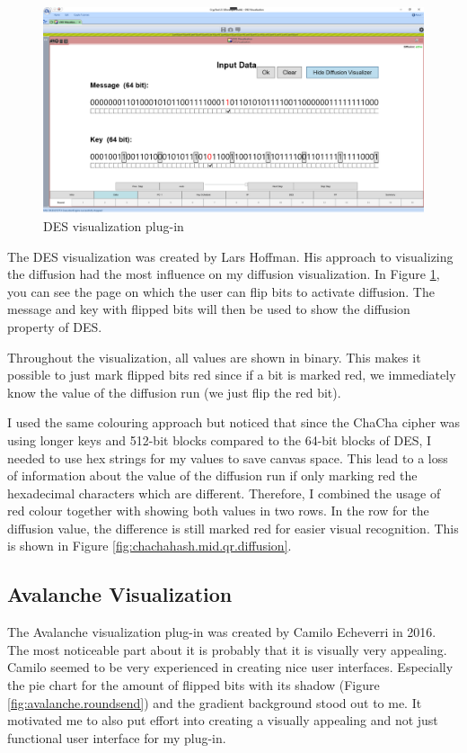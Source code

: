 \begin{figure}
\centering
\includegraphics[width=\textwidth]{figures/ct2/des.png}
\caption{DES visualization plug-in}
\label{fig:des}
\end{figure}

The DES visualization was created by Lars Hoffman. His approach to visualizing the diffusion had the most influence on my diffusion visualization. In Figure \ref{fig:des}, you can see the page on which the user can flip bits to activate diffusion. The message and key with flipped bits will then be used to show the diffusion property of DES. 

Throughout the visualization, all values are shown in binary. This makes it possible to just mark flipped bits red since if a bit is marked red, we immediately know the value of the diffusion run (we just flip the red bit). 

I used the same colouring approach but noticed that since the ChaCha cipher was using longer keys and 512-bit blocks compared to the 64-bit blocks of DES, I needed to use hex strings for my values to save canvas space. This lead to a loss of information about the value of the diffusion run if only marking red the hexadecimal characters which are different. Therefore, I combined the usage of red colour together with showing both values in two rows. In the row for the diffusion value, the difference is still marked red for easier visual recognition. This is shown in Figure \ref{fig:chachahash.mid.qr.diffusion}.

\subsection{Avalanche Visualization}
\label{sec:avalancheVisualization}

The Avalanche visualization plug-in was created by Camilo Echeverri in 2016. The most noticeable part about it is probably that it is visually very appealing. Camilo seemed to be very experienced in creating nice user interfaces. Especially the pie chart for the amount of flipped bits with its shadow (Figure \ref{fig:avalanche.roundsend}) and the gradient background stood out to me. It motivated me to also put effort into creating a visually appealing and not just functional user interface for my plug-in.


